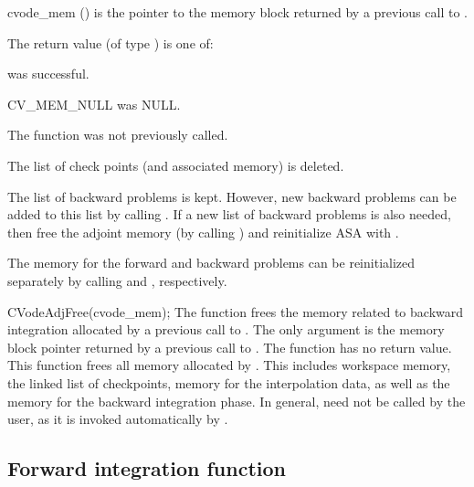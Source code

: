 {
  \begin{args}
  \item[cvode\_mem] () 
    is the pointer to the {\cvodes} memory block returned by a previous call to
    .
  \end{args}
}
{
   The return value  (of type ) is one of:
   \begin{args}
   \item[\Id{CV\_SUCCESS}] 
      was successful.
   \item[CV\_MEM\_NULL] 
      was NULL.
   \item[\Id{CV\_NO\_ADJ}]
     The function  was not previously called.
   \end{args}
}
{
  The list of check points (and associated memory) is deleted.

  The list of backward problems is kept. However, new backward problems can 
  be added to this list by calling . If a new list of backward
  problems is also needed, then free the adjoint memory (by calling
  ) and reinitialize ASA with .

  The {\cvodes} memory for the forward and backward problems can be reinitialized
  separately by calling  and , respectively.
}
{
  CVodeAdjFree(cvode\_mem);
}
{
  The function  frees the memory related to backward integration
  allocated by a previous call to .
}
{
  The only argument is the {\cvodes} memory block pointer returned by a previous call 
  to .
}
{
  The function  has no return value.
}
{
  This function frees all memory allocated by . This
  includes workspace memory, the linked list of checkpoints, memory
  for the interpolation data, as well as the {\cvodes} memory for the
  backward integration phase.  In general,  need not be
  called by the user, as it is invoked automatically by .
}

\subsection{Forward integration function}
\label{sss:cvsolvef}

